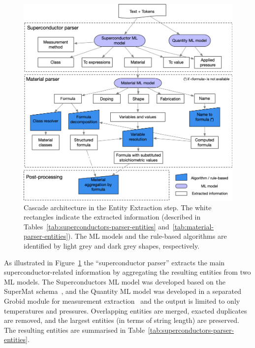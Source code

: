 \documentclass[]{interact}
\theoremstyle{plain}%
\theoremstyle{definition}
\theoremstyle{remark}
\begin{document}
\begin{figure}[ht]
    \includegraphics[width=\textwidth]{schema-extraction-colors}
    \caption{\label{fig:extraction-ml-models-cascade-architecture} Cascade architecture in the Entity Extraction step. The white rectangles indicate the extracted information (described in Tables~\ref{tab:superconductors-parser-entities} and~\ref{tab:material-parser-entities}).
        The ML models and the rule-based algorithms are identified by light grey and dark grey shapes, respectively.}
\end{figure}

As illustrated in Figure~\ref{fig:extraction-ml-models-cascade-architecture} the ``superconductor parser'' extracts the main superconductor-related information by aggregating the resulting entities from two ML models.
The Superconductors ML model was developed based on the SuperMat schema~\cite{foppiano2021supermat}, and the Quantity ML model was developed in a separated Grobid module for measurement extraction~\cite{foppiano2019quantities} and the output is limited to only temperatures and pressures.
Overlapping entities are merged, exacted duplicates are removed, and the largest entities (in terms of string length) are preserved.
The resulting entities are summarised in Table~\ref{tab:superconductors-parser-entities}.
\end{document}
